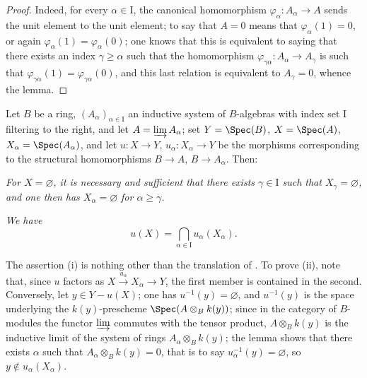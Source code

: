 \begin{proof}
Indeed, for every $\alpha\in\mathrm{I}$, the canonical homomorphism $\varphi_\alpha:A_\alpha\to A$ sends the unit element to the unit element; to say that $A=0$ means that $\varphi_\alpha(1)=0$, or again $\varphi_\alpha(1)=\varphi_\alpha(0)$; one knows that this is equivalent to saying that there exists an index $\gamma\geq\alpha$ such that the homomorphism $\varphi_{\gamma\alpha}:A_\alpha\to A_\gamma$ is such that $\varphi_{\gamma\alpha}(1)=\varphi_{\gamma\alpha}(0)$, and this last relation is equivalent to $A_\gamma=0$, whence the lemma.
\end{proof}

\begin{proposition}[1.9.2]
\label{IV.1.9.2}
Let $B$ be a ring, $(A_\alpha)_{\alpha\in\mathrm{I}}$ an inductive system of $B$-algebras with index set $\mathrm{I}$ filtering to the right, and let $A=\varinjlim A_\alpha$; set $Y=\Spec(B)$, $X=\Spec(A)$, $X_\alpha=\Spec(A_\alpha)$, and let $u:X\to Y$, $u_\alpha:X_\alpha\to Y$ be the morphisms corresponding to the structural homomorphisms $B\to A$, $B\to A_\alpha$.
Then:
\end{proposition}

\begin{env}[1.9.2.i]
\label{IV.1.9.2.i}
\emph{For $X=\varnothing$, it is necessary and sufficient that there exists $\gamma\in\mathrm{I}$ such that $X_\gamma=\varnothing$, and one then has $X_\alpha=\varnothing$ for $\alpha\geq\gamma$.}
\end{env}

\begin{env}[1.9.2.ii]
\label{IV.1.9.2.ii}
\emph{We have}
\[
  u(X)=\bigcap_{\alpha\in\mathrm{I}} u_\alpha(X_\alpha). \tag{1.9.2.1}
\]
\end{env}

The assertion (i) is nothing other than the translation of .
To prove (ii), note that, since $u$ factors as $X\xrightarrow{u_\alpha} X_\alpha\xrightarrow{} Y$, the first member is contained in the second.
Conversely, let $y\in Y-u(X)$; one has $u^{-1}(y)=\varnothing$, and $u^{-1}(y)$ is the space underlying the $k(y)$-prescheme $\Spec(A\otimes_B k(y))$; since in the category of $B$-modules the functor $\varinjlim$ commutes with the tensor product, $A\otimes_B k(y)$ is the inductive limit of the system of rings $A_\alpha\otimes_B k(y)$; the lemma  shows that there exists $\alpha$ such that $A_\alpha\otimes_B k(y)=0$, that is to say $u_\alpha^{-1}(y)=\varnothing$, so $y\notin u_\alpha(X_\alpha)$.

